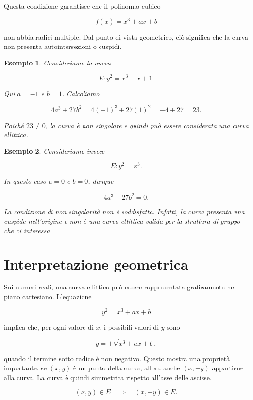 \documentclass[12pt,a4paper,oneside]{report}
\newtheorem{example}{Esempio}[chapter]
\begin{document}
Questa condizione garantisce che il polinomio cubico

\begin{equation}
    f(x) = x^3 + ax + b
\end{equation}

non abbia radici multiple. Dal punto di vista geometrico, ciò significa che la curva non presenta autointersezioni o cuspidi.

\begin{example}
Consideriamo la curva

\[
E: y^2 = x^3 - x + 1.
\]

Qui \(a=-1\) e \(b=1\). Calcoliamo

\[
4a^3 + 27b^2 = 4(-1)^3 + 27(1)^2 = -4 + 27 = 23.
\]

Poiché \(23 \neq 0\), la curva è non singolare e quindi può essere considerata una curva ellittica.
\end{example}

\begin{example}
Consideriamo invece

\[
E: y^2 = x^3.
\]

In questo caso \(a=0\) e \(b=0\), dunque

\[
4a^3 + 27b^2 = 0.
\]

La condizione di non singolarità non è soddisfatta. Infatti, la curva presenta una cuspide nell'origine e non è una curva ellittica valida per la struttura di gruppo che ci interessa.
\end{example}

\section{Interpretazione geometrica}

Sui numeri reali, una curva ellittica può essere rappresentata graficamente nel piano cartesiano. L'equazione

\[
y^2 = x^3 + ax + b
\]

implica che, per ogni valore di \(x\), i possibili valori di \(y\) sono

\[
y = \pm \sqrt{x^3 + ax + b},
\]

quando il termine sotto radice è non negativo. Questo mostra una proprietà importante: se \((x,y)\) è un punto della curva, allora anche \((x,-y)\) appartiene alla curva. La curva è quindi simmetrica rispetto all'asse delle ascisse.

\begin{equation}
    (x,y) \in E \quad \Longrightarrow \quad (x,-y) \in E.
\end{equation}
\end{document}
